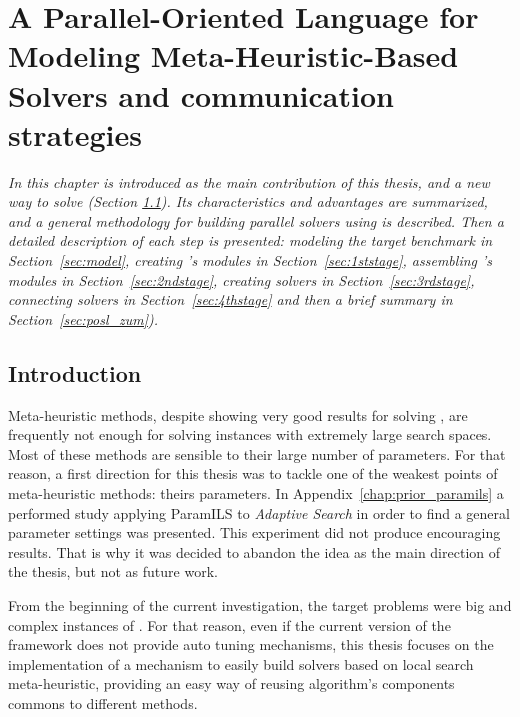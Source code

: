 \chapter[\posl{}: Parallel Oriented Solver~Language]{A Parallel-Oriented Language for Modeling Meta-Heuristic-Based Solvers and communication strategies}
\label{chap:posl}
\textit{In this chapter \posl{} is introduced as the main contribution of this thesis, and a new way to solve \csps{} (Section \ref{sec:posl_intro}). Its characteristics and advantages are summarized, and a general methodology for building parallel solvers using \posl{} is described. Then a detailed description of each step is presented: modeling the target benchmark in Section~\ref{sec:model}, creating \posl's modules in Section~\ref{sec:1ststage}, assembling \posl's modules in Section~\ref{sec:2ndstage}, creating \posl{} solvers in Section~\ref{sec:3rdstage}, connecting solvers in Section~\ref{sec:4thstage} and then a brief summary in Section~\ref{sec:posl_zum}).}
\vfill
\minitoc
\newpage

\section{Introduction}
\label{sec:posl_intro}

Meta-heuristic methods, despite showing very good results for solving \CSPs, are frequently not enough for solving instances with extremely large search spaces. Most of these methods are sensible to their large number of parameters. For that reason, a first direction for this thesis was to tackle one of the weakest points of meta-heuristic methods: theirs parameters. In Appendix~\ref{chap:prior_paramils} a performed study applying {\sc ParamILS} to {\it Adaptive Search} in order to find a general parameter settings was presented. This experiment did not produce encouraging results. That is why it was decided to abandon the idea as the main direction of the thesis, but not as future work.

From the beginning of the current investigation, the target problems were big and complex instances of \csps. For that reason, even if the current version of the framework does not provide auto tuning mechanisms, this thesis focuses on the implementation of a mechanism to easily build solvers based on local search meta-heuristic, providing an easy way of reusing algorithm's components commons to different methods.

